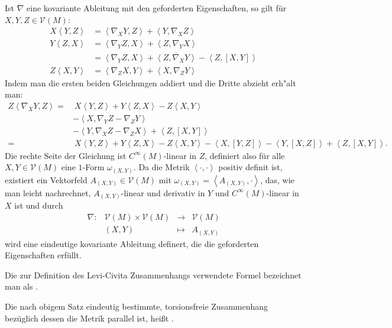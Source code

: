 \begin{bew}
Ist $\nabla$ eine kovariante Ableitung mit den geforderten Eigenschaften, so gilt für $X,Y,Z \in \mathcal V(M)$:
\begin{align*}
	X\left<Y,Z\right> & = \left<\nabla_XY,Z\right> + \left<Y,\nabla_XZ\right>\\
	Y\left<Z,X\right> & = \left<\nabla_YZ,X\right> + \left<Z,\nabla_YX\right>\\
	& = \left<\nabla_YZ,X\right> + \overline{\left<Z,\nabla_XY\right>} - \left<Z,[X,Y]\right>\\
	Z\left<X,Y\right> & = \left<\nabla_ZX,Y \right> + \left<X,\nabla_ZY\right>
\end{align*}
Indem man die ersten beiden Gleichungen addiert und die Dritte abzieht erh"alt man:
\begin{align*}
	Z\left<\nabla_XY,Z\right> = & \ X \left<Y,Z\right> + Y\left<Z,X\right> - Z\left<X,Y\right>\\
	& - \left<X,\nabla_YZ - \nabla_ZY\right> \\
	& - \left<Y,\nabla_XZ - \nabla_ZX\right> + \left<Z,[X,Y]\right>\\
	= & \ X\left<Y,Z\right> + Y\left<Z,X\right> - Z\left<X,Y\right> - \left<X,[Y,Z]\right> - \left<Y,[X,Z]\right> + \left<Z,[X,Y]\right>.
\end{align*}
Die rechte Seite der Gleichung ist $C^{\infty}(M)$-linear in $Z$, definiert also für alle $X,Y \in \mathcal V(M)$ eine $1$-Form $\omega_{(X,Y)}$.
Da die Metrik $\left<\cdot,\cdot\right>$ positiv definit ist, existiert ein Vektorfeld $A_{(X,Y)} \in \mathcal V(M)$ mit $\omega_{(X,Y)} = \left<A_{(X,Y)},\cdot\right>$, das, wie man leicht nachrechnet, $A_{(X,Y)}$-linear und derivativ in $Y$ und $C^{\infty}(M)$-linear in $X$ ist und durch
\[\begin{array}{cccc}
	\nabla \colon & \mathcal V(M) \times \mathcal V(M) &\to& \mathcal V(M)\\
	&(X,Y) &\mapsto& A_{(X,Y)}
\end{array}\]
wird eine eindeutige kovariante Ableitung definert, die die geforderten Eigenschaften erfüllt.
\end{bew}

\begin{bem}
  Die zur Definition des Levi-Civita Zusammenhangs verwendete Formel bezeichnet man als .
\end{bem}

\begin{Dfn}
  Die nach obigem Satz eindeutig bestimmte, torsionsfreie Zusammenhang bezüglich dessen die Metrik parallel ist, heißt .
\end{Dfn}

